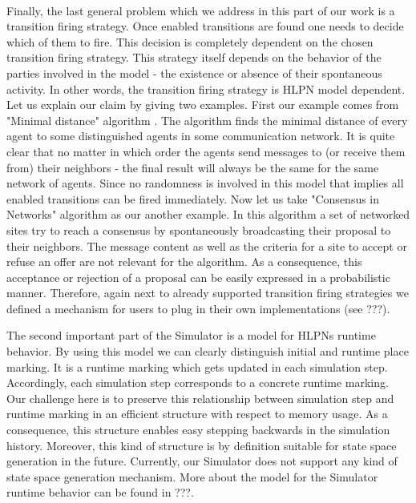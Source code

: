 \\Finally, the last general problem which we address in this part of our work is a transition firing strategy. Once enabled transitions are found one needs to decide which of them to fire. This decision is completely dependent on the chosen transition firing strategy. This strategy itself depends on the behavior of the parties involved in the model - the existence or absence of their spontaneous activity. In other words, the transition firing strategy is HLPN model dependent. Let us explain our claim by giving two examples. First our example comes from "Minimal distance" algorithm \cite{min-dist}. The algorithm finds the minimal distance of every agent to some distinguished agents in some communication network. It is quite clear that no matter in which order the agents send messages to (or receive them from) their neighbors - the final result will always be the same for the same network of agents. Since no randomness is involved in this model that implies all enabled transitions can be fired immediately. Now let us take "Consensus in Networks" algorithm \cite{reisig} as our another example. In this algorithm a set of networked sites try to reach a consensus by spontaneously broadcasting their proposal to their neighbors. The message content as well as the criteria for a site to accept or refuse an offer are not relevant for the algorithm. As a consequence, this acceptance or rejection of a proposal can be easily expressed in a probabilistic manner. Therefore, again next to already supported transition firing strategies we defined a mechanism for users to plug in their own implementations (see ???).

The second important part of the Simulator is a model for HLPNs runtime behavior. By using this model we can clearly distinguish initial and runtime place marking. It is a runtime marking which gets updated in each simulation step. Accordingly, each simulation step corresponds to a concrete runtime marking. Our challenge here is to preserve this relationship between simulation step and runtime marking in an efficient structure with respect to memory usage. As a consequence, this structure enables easy stepping backwards in the simulation history. Moreover, this kind of structure is by definition suitable for state space generation in the future. Currently, our Simulator does not support any kind of state space generation mechanism. More about the model for the Simulator runtime behavior can be found in ???.

